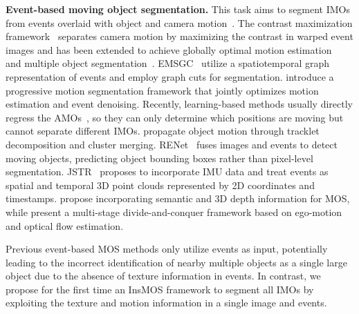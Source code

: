 \noindent\textbf{Event-based moving object segmentation.} This task aims to segment IMOs from events overlaid with object and camera motion~\citep{eventdatasets:mitrokhin_EVIMO_IROS_2019, eventmos:mitrokhin_modt_iros_2018}. 
The contrast maximization framework~\citep{eventmos:Gallego_Unifyingcontrastmax_cvpr_2018} separates camera motion by maximizing the contrast in warped event images and has been extended to achieve globally optimal motion estimation~\citep{eventmos:peng_globally_TPAMI_2021} and multiple object segmentation~\citep{eventmos:stoffregen_eventcompensation_ICCV_2019}. 
EMSGC~\citep{eventmos:zhou_EMSGC_TNNLS_2021} utilize a spatiotemporal graph representation of events and employ graph cuts for segmentation.
 introduce a progressive motion segmentation framework that jointly optimizes motion estimation and event denoising. 
Recently, learning-based methods usually directly regress the AMOs~\citep{eventdatasets:mitrokhin_EVIMO_IROS_2019, eventmos:mitrokhin_learningms_CVPR_2020, eventmos:wang_evumoseg_arXiv_2023}, so they can only determine which positions are moving but cannot separate different IMOs. 
\cite{eventmos:parameshwara_0mms_ICRA_2021} propagate object motion through tracklet decomposition and cluster merging. 
RENet~\citep{eventmos:zhou_MOD_ICRA_2023} fuses images and events to detect moving objects, predicting object bounding boxes rather than pixel-level segmentation. 
JSTR~\citep{eventmos:zhou_jstr_ICRA_2024} proposes to incorporate IMU data and treat events as spatial and temporal 3D point clouds represented by 2D coordinates and timestamps. 
\cite{eventmos:jiang_semantic_VISAPP_2024} propose incorporating semantic and 3D depth information for MOS, while \cite{eventmos:Stamatios_GeneralMOS_3DV_2024} present a multi-stage divide-and-conquer framework based on ego-motion and optical flow estimation. 



Previous event-based MOS methods only utilize events as input, potentially leading to the incorrect identification of nearby multiple objects as a single large object due to the absence of texture information in events.
In contrast, we propose for the first time an InsMOS framework to segment all IMOs by exploiting the texture and motion information in a single image and events.